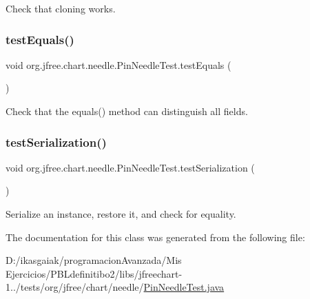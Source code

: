 Check that cloning works. \mbox{\label{classorg_1_1jfree_1_1chart_1_1needle_1_1_pin_needle_test_a0b750e14fbacebdeceefaf69c7e9f2ee}} 
\subsubsection{\texorpdfstring{test\+Equals()}{testEquals()}}
{\footnotesize\ttfamily void org.\+jfree.\+chart.\+needle.\+Pin\+Needle\+Test.\+test\+Equals (\begin{DoxyParamCaption}{ }\end{DoxyParamCaption})}

Check that the equals() method can distinguish all fields. \mbox{\label{classorg_1_1jfree_1_1chart_1_1needle_1_1_pin_needle_test_ae7f6cb9bc093c2abd59a6dc926519fc9}} 
\subsubsection{\texorpdfstring{test\+Serialization()}{testSerialization()}}
{\footnotesize\ttfamily void org.\+jfree.\+chart.\+needle.\+Pin\+Needle\+Test.\+test\+Serialization (\begin{DoxyParamCaption}{ }\end{DoxyParamCaption})}

Serialize an instance, restore it, and check for equality. 

The documentation for this class was generated from the following file\+:\begin{DoxyCompactItemize}
\item 
D\+:/ikasgaiak/programacion\+Avanzada/\+Mis Ejercicios/\+P\+B\+Ldefinitibo2/libs/jfreechart-\/1../tests/org/jfree/chart/needle/\mbox{\hyperlink{_pin_needle_test_8java}{Pin\+Needle\+Test.\+java}}\end{DoxyCompactItemize}
